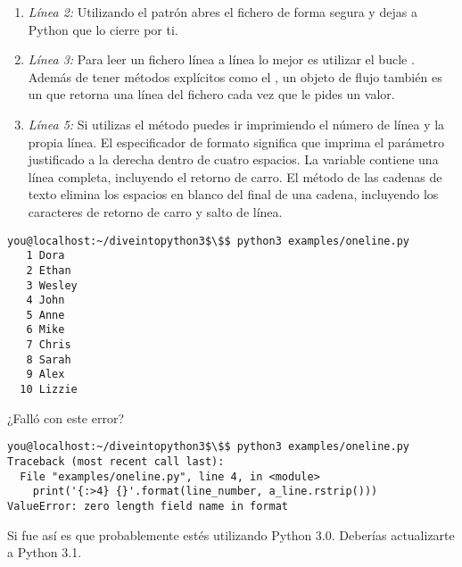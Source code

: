 \begin{enumerate}

\item \emph{Línea 2:} Utilizando el patrón  abres el fichero de forma segura y dejas a Python que lo cierre por ti.

\item \emph{Línea 3:} Para leer un fichero línea a línea lo mejor es utilizar el bucle . Además de tener métodos explícitos como el , un objeto de flujo también es un  que retorna una línea del fichero cada vez que le pides un valor.

\item \emph{Línea 5:} Si utilizas el método  puedes ir imprimiendo el número de línea y la propia línea. El especificador de formato  significa que imprima el parámetro justificado a la derecha dentro de cuatro espacios. La variable  contiene una línea completa, incluyendo el retorno de carro. El método  de las cadenas de texto elimina los espacios en blanco del final de una cadena, incluyendo los caracteres de retorno de carro y salto de línea. 

\end{enumerate}

\noindent\begin{minipage}{\textwidth}
\begin{lstlisting}[mathescape=True]
you@localhost:~/diveintopython3$\$$ python3 examples/oneline.py
   1 Dora
   2 Ethan
   3 Wesley
   4 John
   5 Anne
   6 Mike
   7 Chris
   8 Sarah
   9 Alex
  10 Lizzie
\end{lstlisting}
\end{minipage}

¿Falló con este error?

\noindent\begin{minipage}{\textwidth}
\begin{lstlisting}[mathescape=True]
you@localhost:~/diveintopython3$\$$ python3 examples/oneline.py
Traceback (most recent call last):
  File "examples/oneline.py", line 4, in <module>
    print('{:>4} {}'.format(line_number, a_line.rstrip()))
ValueError: zero length field name in format
\end{lstlisting}
\end{minipage}

Si fue así es que probablemente estés utilizando Python 3.0. Deberías actualizarte a Python 3.1.

